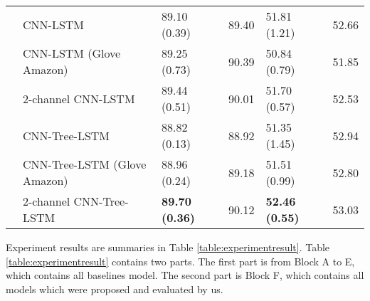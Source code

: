 \begin{table*}[]
\begin{tabular}{|c|l|ll|ll|}
		 & CNN-LSTM                                 & 89.10 (0.39)  & 89.40 & 51.81 (1.21) & 52.66 \\
		  & CNN-LSTM (Glove Amazon) & 89.25 (0.73) & 90.39  & 50.84 (0.79) & 51.85 \\
		& 2-channel CNN-LSTM                        & 89.44    (0.51) & 90.01 & 51.70 (0.57) & 52.53 \\
		 & CNN-Tree-LSTM                            & 88.82 (0.13) & 88.92 & 51.35 (1.45) & 52.94 \\
		& CNN-Tree-LSTM (Glove Amazon)             & 88.96 (0.24) & 89.18 & 51.51 (0.99) & 52.80 \\
		& 2-channel CNN-Tree-LSTM  & \textbf{89.70 (0.36)} & 90.12  & \textbf{52.46 (0.55)} & 53.03 \Bstrut  \\
		\hline
	\end{tabular}
\end{table*}
Experiment results are summaries in Table \ref{table:experimentresult}.
Table \ref{table:experimentresult} contains two parts.
The first part is from Block A to E, which contains all baselines model.
The second part is Block F, which contains all models which were proposed and evaluated by us.
